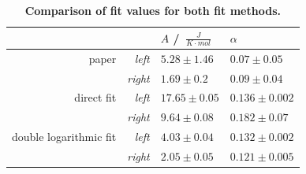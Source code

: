 \documentclass{include/thesisclass3}
\newcommand{\cc}{\cdot}
\newcommand{\e}[1]{\,\si{#1}}
\begin{document}
\begin{table}[H]
\centering
\caption{\label{neeltable}\textbf{Comparison of fit values for both fit methods.}}
\begin{tabular}{rr|ll}
 	& 	&$A$ / $\e{\frac{J}{K \cc mol}}$ & $\alpha$ \\
\midrule
paper & \textit{left}  &$5.28 \pm 1.46 $&$0.07 \pm 0.05$\\
 & \textit{right}  &$1.69 \pm 0.2$&$0.09 \pm 0.04$ \\
\midrule
direct fit & \textit{left} &$17.65 \pm 0.05$&$0.136 \pm 0.002$\\
 & \textit{right} & $9.64 \pm 0.08$&$0.182 \pm 0.07$ \\
\midrule
double logarithmic fit & \textit{left} & $4.03 \pm 0.04$ & $0.132 \pm 0.002$\\
 & \textit{right} & $2.05 \pm 0.05$ & $0.121 \pm 0.005$\\
\midrule
\end{tabular}
\end{table}
\end{document}
